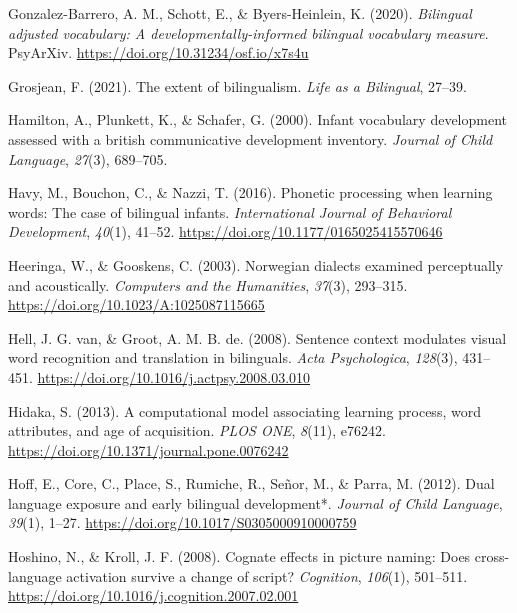 \documentclass[
]{article}
\newlength{\cslhangindent}
\newlength{\cslentryspacingunit} %
\newenvironment{CSLReferences}[2] %
 {%
  \setlength{\parindent}{0pt}
  \ifodd #1
  \let\oldpar\par
  \def\par{\hangindent=\cslhangindent\oldpar}
  \fi
  \setlength{\parskip}{#2\cslentryspacingunit}
 }%
 {}
\begin{document}
\begin{CSLReferences}{1}{0}
\leavevmode{}%
Gonzalez-Barrero, A. M., Schott, E., \& Byers-Heinlein, K. (2020).
\emph{Bilingual adjusted vocabulary: A developmentally-informed
bilingual vocabulary measure}. {PsyArXiv}.
\url{https://doi.org/10.31234/osf.io/x7s4u}

\leavevmode{}%
Grosjean, F. (2021). The extent of bilingualism. \emph{Life as a
Bilingual}, 27--39.

\leavevmode{}%
Hamilton, A., Plunkett, K., \& Schafer, G. (2000). Infant vocabulary
development assessed with a british communicative development inventory.
\emph{Journal of Child Language}, \emph{27}(3), 689--705.

\leavevmode{}%
Havy, M., Bouchon, C., \& Nazzi, T. (2016). Phonetic processing when
learning words: The case of bilingual infants. \emph{International
Journal of Behavioral Development}, \emph{40}(1), 41--52.
\url{https://doi.org/10.1177/0165025415570646}

\leavevmode{}%
Heeringa, W., \& Gooskens, C. (2003). Norwegian dialects examined
perceptually and acoustically. \emph{Computers and the Humanities},
\emph{37}(3), 293--315. \url{https://doi.org/10.1023/A:1025087115665}

\leavevmode{}%
Hell, J. G. van, \& Groot, A. M. B. de. (2008). Sentence context
modulates visual word recognition and translation in bilinguals.
\emph{Acta Psychologica}, \emph{128}(3), 431--451.
\url{https://doi.org/10.1016/j.actpsy.2008.03.010}

\leavevmode{}%
Hidaka, S. (2013). A computational model associating learning process,
word attributes, and age of acquisition. \emph{{PLOS} {ONE}},
\emph{8}(11), e76242. \url{https://doi.org/10.1371/journal.pone.0076242}

\leavevmode{}%
Hoff, E., Core, C., Place, S., Rumiche, R., Señor, M., \& Parra, M.
(2012). Dual language exposure and early bilingual development*.
\emph{Journal of Child Language}, \emph{39}(1), 1--27.
\url{https://doi.org/10.1017/S0305000910000759}

\leavevmode{}%
Hoshino, N., \& Kroll, J. F. (2008). Cognate effects in picture naming:
Does cross-language activation survive a change of script?
\emph{Cognition}, \emph{106}(1), 501--511.
\url{https://doi.org/10.1016/j.cognition.2007.02.001}


\end{CSLReferences}
\end{document}
